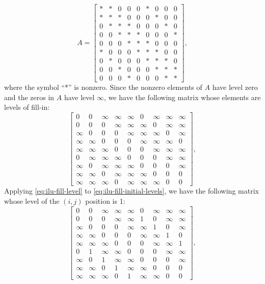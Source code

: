 \begin{equation}\label{eq:ilu-fill-example-matrix}A=\begin{bmatrix}
*&*&0&0&0&*&0&0&0\\
*&*&*&0&0&0&*&0&0\\
0&*&*&*&0&0&0&*&0\\
0&0&*&*&*&0&0&0&*\\
0&0&0&*&*&*&0&0&0\\
*&0&0&0&*&*&*&0&0\\
0&*&0&0&0&*&*&*&0\\
0&0&*&0&0&0&*&*&*\\
0&0&0&*&0&0&0&*&*
\end{bmatrix},\end{equation}
{where the symbol ``*'' is nonzero. Since the nonzero elements of $A$ have level zero and the zeros in $A$ have level $\infty$, we have the following matrix whose elements are levels of fill-in:}
\begin{equation}\label{eq:ilu-fill-initial-levels}\begin{bmatrix}
0&0&\infty&\infty&\infty&0&\infty&\infty&\infty\\
0&0&0&\infty&\infty&\infty&0&\infty&\infty\\
\infty&0&0&0&\infty&\infty&\infty&0&\infty\\
\infty&\infty&0&0&0&\infty&\infty&\infty&0\\
\infty&\infty&\infty&0&0&0&\infty&\infty&\infty\\
0&\infty&\infty&\infty&0&0&0&\infty&\infty\\
\infty&0&\infty&\infty&\infty&0&0&0&\infty\\
\infty&\infty&0&\infty&\infty&\infty&0&0&0\\
\infty&\infty&\infty&0&\infty&\infty&\infty&0&0
\end{bmatrix},\end{equation}
{Applying \eqref{eq:ilu-fill-level} to \eqref{eq:ilu-fill-initial-levels}, we have the following matrix whose level of the $(i,j)$ position is 1:}
\[\begin{bmatrix}
0&0&\infty&\infty&\infty&0&\infty&\infty&\infty\\
0&0&0&\infty&\infty&1&0&\infty&\infty\\
\infty&0&0&0&\infty&\infty&1&0&\infty\\
\infty&\infty&0&0&0&\infty&\infty&1&0\\
\infty&\infty&\infty&0&0&0&\infty&\infty&1\\
0&1&\infty&\infty&0&0&0&\infty&\infty\\
\infty&0&1&\infty&\infty&0&0&0&\infty\\
\infty&\infty&0&1&\infty&\infty&0&0&0\\
\infty&\infty&\infty&0&1&\infty&\infty&0&0
\end{bmatrix},\]
